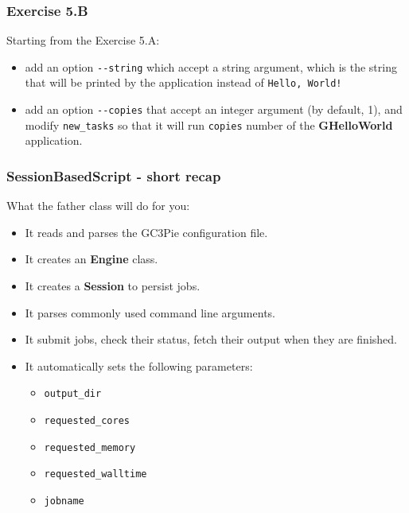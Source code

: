 \documentclass[english,serif,mathserif,xcolor=pdftex,dvipsnames,table]{beamer}
\begin{document}
\begin{frame}[fragile]
  \frametitle{Exercise 5.B}
  Starting from the  Exercise 5.A:
  \begin{itemize}
  \item add an option \lstinline|--string| which accept a string
    argument, which is the string that will be
  printed by the application instead of \texttt{Hello, World!}
\item add an option \lstinline|--copies| that accept an integer
  argument (by default, 1), and modify \lstinline|new_tasks| so that
  it will run \lstinline|copies| number of the \textbf{GHelloWorld} application.
  
  \end{itemize}
\end{frame}


\begin{frame}
  \frametitle{SessionBasedScript - short recap}
  What the father class will do for you:
  \begin{itemize}
  \item It reads and parses the GC3Pie configuration file.
  \item It creates an \textbf{Engine} class.
  \item It creates a \textbf{Session} to persist jobs.
  \item It parses commonly used command line arguments.
  \item It submit jobs, check their status, fetch their output when
    they are finished.
  \item It automatically sets the following parameters:
    \begin{itemize}
    \item \lstinline|output_dir|
    \item \lstinline|requested_cores|
    \item \lstinline|requested_memory|
    \item \lstinline|requested_walltime|
    \item \lstinline|jobname| 
    \end{itemize}

  \end{itemize}
\end{frame}
\end{document}
